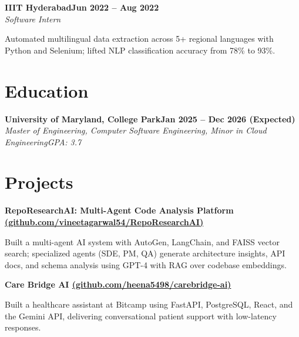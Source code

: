 \documentclass[letterpaper,10pt]{article}
\newlength{\listTopSep}       \setlength{\listTopSep}{1pt}      %
\newlength{\listBottomTrim}   \setlength{\listBottomTrim}{-3pt} %
\newcommand{\heading}[2]{
  \hspace{10pt}#1\hfill#2\\
}
\newcommand{\headingBf}[2]{
  \heading{\textbf{#1}}{\textbf{#2}}
}
\newcommand{\headingIt}[2]{
  \heading{\textit{#1}}{\textit{#2}}
}
\newenvironment{resume_list}{
  \vspace{0pt}
  \begin{itemize}[itemsep=0pt, parsep=0pt, leftmargin=30pt, topsep=\listTopSep]
}{
  \end{itemize}
  \vspace{\listBottomTrim}
}
\begin{document}
  \headingBf{IIIT Hyderabad}{Jun 2022 -- Aug 2022}
  \headingIt{Software Intern}{}
  \begin{resume_list}
    \item Automated multilingual data extraction across 5+ regional languages with Python and Selenium; lifted NLP classification accuracy from 78\% to 93\%.
  \end{resume_list}


  \section{Education}

  \headingBf{University of Maryland, College Park}{Jan 2025 -- Dec 2026 (Expected)}
  \headingIt{Master of Engineering, Computer Software Engineering, Minor in Cloud Engineering}{GPA: 3.7}


  \section{Projects}

  \headingBf{RepoResearchAI: Multi-Agent Code Analysis Platform \href{https://github.com/vineetagarwal54/RepoResearchAI}{(github.com/vineetagarwal54/RepoResearchAI)}}{}
  \begin{resume_list}
    \item Built a multi-agent AI system with AutoGen, LangChain, and FAISS vector search; specialized agents (SDE, PM, QA) generate architecture insights, API docs, and schema analysis using GPT-4 with RAG over codebase embeddings.
  \end{resume_list}

  \headingBf{Care Bridge AI \href{https://github.com/heena5498/carebridge-ai}{(github.com/heena5498/carebridge-ai)}}{}
  \begin{resume_list}
    \item Built a healthcare assistant at Bitcamp using FastAPI, PostgreSQL, React, and the Gemini API, delivering conversational patient support with low-latency responses.
  \end{resume_list}
\end{document}
